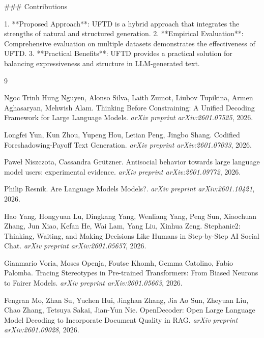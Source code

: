 ### Contributions

1. **Proposed Approach**: UFTD is a hybrid approach that integrates the strengths of natural and structured generation.
2. **Empirical Evaluation**: Comprehensive evaluation on multiple datasets demonstrates the effectiveness of UFTD.
3. **Practical Benefits**: UFTD provides a practical solution for balancing expressiveness and structure in LLM-generated text.

\begin{thebibliography}{9}

Ngoc Trinh Hung Nguyen, Alonso Silva, Laith Zumot, Liubov Tupikina, Armen Aghasaryan, Mehwish Alam. \newblock Thinking Before Constraining: A Unified Decoding Framework for Large Language Models. \newblock \emph{arXiv preprint arXiv:2601.07525}, 2026.

Longfei Yun, Kun Zhou, Yupeng Hou, Letian Peng, Jingbo Shang. \newblock Codified Foreshadowing-Payoff Text Generation. \newblock \emph{arXiv preprint arXiv:2601.07033}, 2026.

Paweł Niszczota, Cassandra Grützner. \newblock Antisocial behavior towards large language model users: experimental evidence. \newblock \emph{arXiv preprint arXiv:2601.09772}, 2026.

Philip Resnik. \newblock Are Language Models Models?. \newblock \emph{arXiv preprint arXiv:2601.10421}, 2026.

Hao Yang, Hongyuan Lu, Dingkang Yang, Wenliang Yang, Peng Sun, Xiaochuan Zhang, Jun Xiao, Kefan He, Wai Lam, Yang Liu, Xinhua Zeng. \newblock Stephanie2: Thinking, Waiting, and Making Decisions Like Humans in Step-by-Step AI Social Chat. \newblock \emph{arXiv preprint arXiv:2601.05657}, 2026.

Gianmario Voria, Moses Openja, Foutse Khomh, Gemma Catolino, Fabio Palomba. \newblock Tracing Stereotypes in Pre-trained Transformers: From Biased Neurons to Fairer Models. \newblock \emph{arXiv preprint arXiv:2601.05663}, 2026.

Fengran Mo, Zhan Su, Yuchen Hui, Jinghan Zhang, Jia Ao Sun, Zheyuan Liu, Chao Zhang, Tetsuya Sakai, Jian-Yun Nie. \newblock OpenDecoder: Open Large Language Model Decoding to Incorporate Document Quality in RAG. \newblock \emph{arXiv preprint arXiv:2601.09028}, 2026.


\end{thebibliography}
